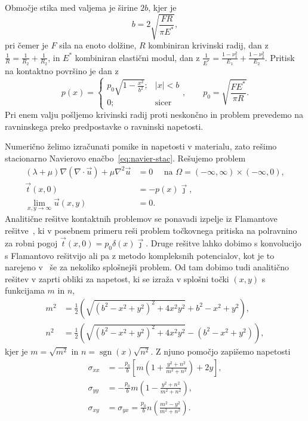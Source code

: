\documentclass[12pt,a4paper,twoside]{article}
\theoremstyle{definition} %
\theoremstyle{plain} %
\numberwithin{equation}{section}
\newcommand{\vt}{\vec{t}}
\newcommand{\vu}{\vec{u}}
\newcommand{\vj}{\vec{\jmath}}
\DeclareMathOperator{\sgn}{sgn}
\begin{document}
Območje stika med valjema je širine $2b$, kjer je
\begin{equation}
  b = 2\sqrt{\frac{F R}{\pi E^\ast}},
\end{equation}
pri čemer je $F$ sila na enoto dolžine, $R$ kombiniran krivinski radij, dan z $\frac1R = \frac1{R_2}
+ \frac1{R_2}$, in $E^\ast$ kombiniran elastični modul, dan z $\frac{1}{E^\ast} = \frac{1-\nu_1^2}{E_1}
+ \frac{1-\nu_2^2}{E_2}$. Pritisk na kontaktno površino je dan z
\begin{equation}
  p(x) = \begin{cases}
    p_0 \sqrt{1-\frac{x^2}{b^2}}; & |x| < b \\
    0; & \text{sicer}
  \end{cases}, \qquad p_0 = \sqrt{\frac{FE^\ast}{\pi R}}.
\end{equation}
Pri enem valju pošljemo krivinski radij proti
neskončno in problem prevedemo na ravninskega preko predpostavke o ravninski napetosti.

Numerično želimo izračunati pomike in napetosti v materialu, zato rešimo stacionarno Navierovo
enačbo~\eqref{eq:navier-stac}. Rešujemo problem
\begin{align}
  (\lambda + \mu) \nabla(\nabla\cdot \vu) + \mu \nabla^2 \vu &= 0 \quad \text{ na } \Omega =
  (-\infty, \infty) \times (-\infty, 0), \nonumber \\
  \vt(x, 0) &= -p(x)\vj, \label{eq:hertzian-problem}  \\
  \lim_{x, y\to\infty} \vu(x, y) &= 0. \nonumber
\end{align}
Analitične rešitve kontaktnih problemov se ponavadi izpelje iz Flamantove
rešitve~\cite[str.~294]{slaughter2012linearized}, ki v posebnem primeru reši problem
točkovnega pritiska na polravnino za robni pogoj $\vt(x, 0) = p_0\delta(x)\vj$. Druge rešitve lahko
dobimo s konvolucijo s Flamantovo rešitvijo ali pa z metodo kompleksnih potencialov, kot je to
narejeno v~\cite{mcewen1949stresses} še za nekoliko splošnejši problem. Od tam dobimo tudi
analitično rešitev v zaprti obliki za napetost, ki se izraža v splošni točki $(x, y)$ s funkcijama
$m$ in $n$,
\begin{align}
  m^2 &= \frac{1}{2} \left(\sqrt{\left(b^2-x^2+y^2\right)^2+4 x^2 y^2}+b^2-x^2+y^2\right), \\
  n^2 &= \frac{1}{2} \left(\sqrt{\left(b^2-x^2+y^2\right)^2+4 x^2 y^2}-(b^2-x^2+y^2)\right),
\end{align}
kjer je $m=\sqrt{m^2}$ in $n=\sgn(x)\sqrt{n^2}$. Z njuno pomočjo zapišemo napetosti
\begin{align}
  \sigma_{xx} &= -\frac{p_0}{b}\left[m\left(1 + \frac{y^2 + n^2}{m^2 + n^2}\right)+2y\right], \\
  \sigma_{yy} &= -\frac{p_0}{b}m\left(1 - \frac{y^2 + n^2}{m^2 + n^2}\right), \\
  \sigma_{xy} &= \sigma_{yx} = \frac{p_0}{b}n\left(\frac{m^2 - y^2}{m^2 + n^2}\right).
\end{align}
\end{document}

